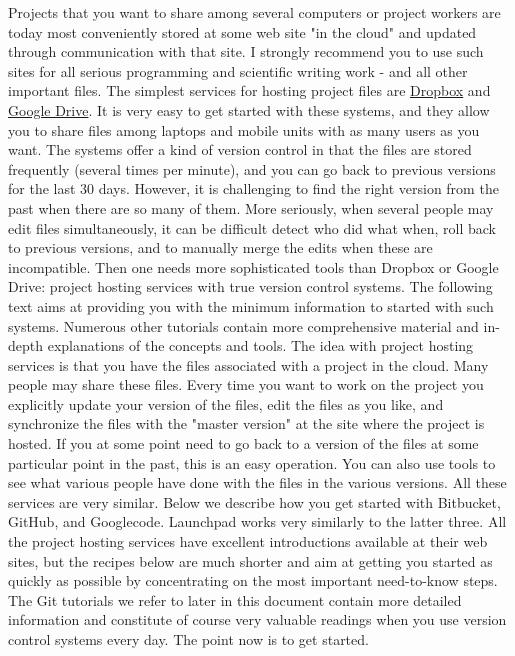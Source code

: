 \documentclass[%
oneside,                 %
final,                   %
10pt]{article}
\theoremstyle{definition}
\begin{document}
\begin{enumerate}
Projects that you want to share among several computers or project
workers are today most conveniently stored at some web site "in the
cloud" and updated through communication with that site. I strongly
recommend you to use such sites for all serious programming and
scientific writing work - and all other important files.
The simplest services for hosting project files are \href{{https://dropbox.com}}{Dropbox} and \href{{https://drive.google.com}}{Google Drive}.
It is very easy to get started with these systems, and they allow you
to share files among laptops and mobile units with as many users as
you want. The systems offer a kind of version control in that the
files are stored frequently (several times per minute), and you can go
back to previous versions for the last 30 days. However, it is
challenging  to find the right version from the past when there are
so many of them.
More seriously, when several people may edit files simultaneously, it
can be difficult detect who did what when, roll back to previous
versions, and to manually merge the edits when these are
incompatible. Then one needs more sophisticated tools than Dropbox or
Google Drive: project hosting services with true version control
systems.  The following text aims at providing you with the minimum
information to started with such systems. Numerous other tutorials
contain more comprehensive material and in-depth explanations of the
concepts and tools.
The idea with project hosting services is that you have the files
associated with a project in the cloud. Many people may share these
files.  Every time you want to work on the project you explicitly
update your version of the files, edit the files as you like, and
synchronize the files with the "master version" at the site where the
project is hosted.  If you at some point need to go back to a
version of the files at some particular point in the past,
this is an easy operation. You can also use tools to see
what various people have done with the files in the various versions.
All these services are very similar. Below we describe how you get
started with Bitbucket, GitHub, and Googlecode. Launchpad works very
similarly to the latter three. All the project hosting services have
excellent introductions available at their web sites, but the recipes
below are much shorter and aim at getting you started as quickly as
possible by concentrating on the most important need-to-know steps.
The Git tutorials we refer to later in this document contain more
detailed information and constitute of course very valuable readings
when you use version control systems every day. The point now is
to get started.

\end{enumerate}
\end{document}
